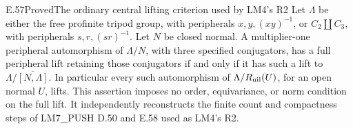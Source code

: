 \begin{result}{E.57}{Proved}{The ordinary central lifting criterion used by LM4's R2}
Let \(\Lambda\) be either the free profinite tripod group, with
peripherals \(x,y,(xy)^{-1}\), or \(C_2\amalg C_3\), with
peripherals \(s,r,(sr)^{-1}\). Let \(N\) be closed normal.
A multiplier-one peripheral automorphism of \(\Lambda/N\), with
three specified conjugators, has a full peripheral lift retaining
those conjugators if and only if it has such a lift to
\(\Lambda/\overline{[N,\Lambda]}\).
In particular every such automorphism of
\(\Lambda/R_{\rm nil}(U)\), for an open normal \(U\), lifts.
This assertion imposes no order, equivariance, or norm condition on
the full lift. It independently reconstructs the finite count and
compactness steps of LM7\_PUSH D.50 and E.58 used as LM4's R2.
\end{result}
